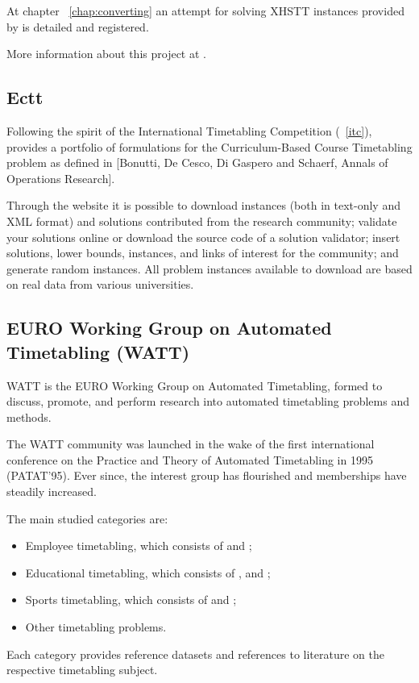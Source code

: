 At chapter ~\ref{chap:converting} an attempt for solving XHSTT instances provided by \cite{Hstt} is detailed and registered.

More information about this project at \cite{Hstt}.


\subsection{Ectt}
\label{ectt}
Following the spirit of the International Timetabling Competition (~\ref{itc}), \cite{Ectt} provides a portfolio of formulations for the Curriculum-Based Course Timetabling problem as defined in [Bonutti, De Cesco, Di Gaspero and Schaerf, Annals of Operations Research].

Through the website it is possible to download instances (both in text-only and XML format) and solutions contributed from the research community; validate your solutions online or download the source code of a solution validator; insert solutions, lower bounds, instances, and links of interest for the community; and generate random instances. All problem instances available to download are based on real data from various universities.


\subsection{EURO Working Group on Automated Timetabling (WATT)}
\label{watt}

WATT is the EURO Working Group on Automated Timetabling, formed to discuss, promote, and perform research into automated timetabling problems and methods.

The WATT community was launched in the wake of the first international conference on the Practice and Theory of Automated Timetabling in 1995 (PATAT'95). Ever since, the interest group has flourished and memberships have steadily increased.

The main studied categories are:
\begin{itemize}
\item Employee timetabling, which consists of  and ;
\item Educational timetabling, which consists of ,  and ;
\item Sports timetabling, which consists of  and ;
\item Other timetabling problems.
\end{itemize}
Each category provides reference datasets and references to literature on the respective timetabling subject.

